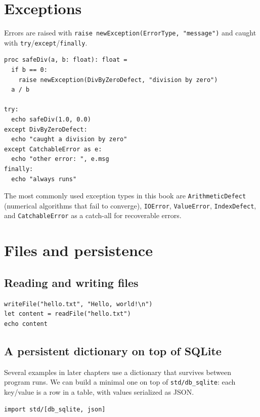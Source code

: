 \documentclass[justified, sixbynine]{tufte-book}
\def\ft{\small\tt}
\theoremstyle{plain}%
\newtheorem * {corollary}{Corollary}
\theoremstyle{definition}
\theoremstyle{remark}
\newtheorem * {remark}{Remark}
\newtheorem * {note}{Note}
\begin{document}
\begin{fullwidth}
\goodbreak\section{Exceptions}


Errors are raised with {\ft raise newException(ErrorType, "message")} and caught with {\ft try}/{\ft except}/{\ft finally}.

\begin{lstlisting}
proc safeDiv(a, b: float): float =
  if b == 0:
    raise newException(DivByZeroDefect, "division by zero")
  a / b

try:
  echo safeDiv(1.0, 0.0)
except DivByZeroDefect:
  echo "caught a division by zero"
except CatchableError as e:
  echo "other error: ", e.msg
finally:
  echo "always runs"
\end{lstlisting}

The most commonly used exception types in this book are {\ft ArithmeticDefect} (numerical algorithms that fail to converge), {\ft IOError}, {\ft ValueError}, {\ft IndexDefect}, and {\ft CatchableError} as a catch-all for recoverable errors.

\goodbreak\section{Files and persistence}

\goodbreak\subsection{Reading and writing files}

\begin{lstlisting}
writeFile("hello.txt", "Hello, world!\n")
let content = readFile("hello.txt")
echo content
\end{lstlisting}

\goodbreak\subsection{A persistent dictionary on top of SQLite}

Several examples in later chapters use a dictionary that survives between program runs. We can build a minimal one on top of {\ft std/db\_sqlite}: each key/value is a row in a table, with values serialized as JSON.


\begin{lstlisting}[caption={in file: {\ft nlib.nim}}]
import std/[db_sqlite, json]


\end{lstlisting}
\end{fullwidth}
\end{document}
